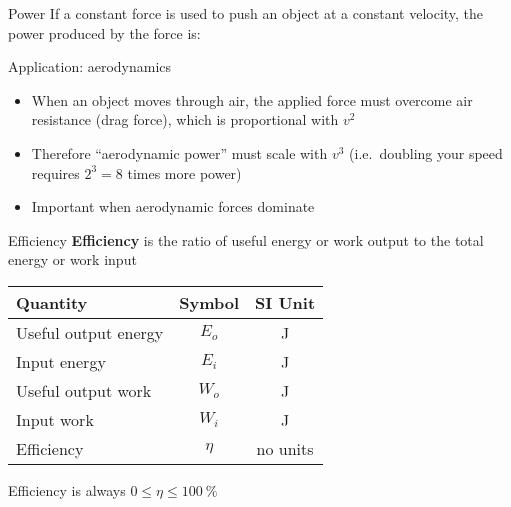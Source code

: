 \documentclass[12pt,compress,aspectratio=169]{beamer}
\begin{document}
\begin{frame}{Power}
  If a constant force is used to push an object at a constant velocity, the
  power produced by the force is:
  
  
  Application: aerodynamics
  \begin{itemize}
  \item When an object moves through air, the applied force must overcome air
    resistance (drag force), which is proportional with $v^2$
    \item Therefore ``aerodynamic power'' must scale with $v^3$ (i.e.\ doubling
      your speed requires $2^3=8$ times more power)
    \item Important when aerodynamic forces dominate
  \end{itemize}
\end{frame}



\begin{frame}{Efficiency}
  \textbf{Efficiency} is the ratio of useful energy or work output to the total
  energy or work input

  \begin{center}
    \begin{tabular}{l|c|c}
      \rowcolor{pink}
      \textbf{Quantity} & \textbf{Symbol} & \textbf{SI Unit} \\ \hline
      Useful output energy & $E_o$ & \si{\joule} \\
      Input energy         & $E_i$ & \si{\joule} \\
      Useful output work   & $W_o$ & \si{\joule} \\
      Input work           & $W_i$ & \si{\joule} \\
      Efficiency           & $\eta$ & no units
    \end{tabular}
  \end{center}
  Efficiency is always $0\leq\eta\leq\SI{100}{\percent}$
\end{frame}
\end{document}

